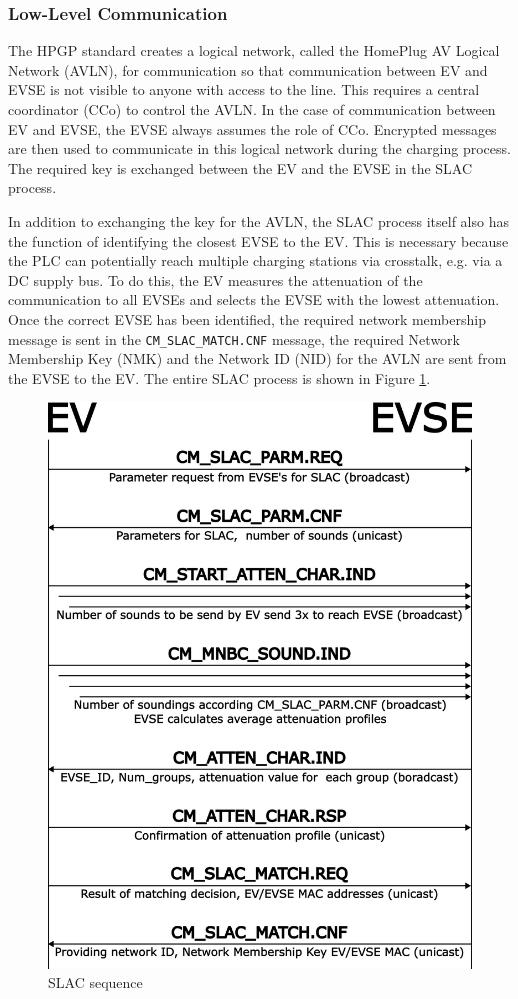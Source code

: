 \documentclass[sigconf]{acmart}
\begin{document}
\subsubsection{Low-Level Communication}
The HPGP standard creates a logical network, called the HomePlug AV Logical Network (AVLN), for communication so that communication between EV and EVSE is not visible to anyone with access to the line. This requires a central coordinator (CCo) to control the AVLN. In the case of communication between EV and EVSE, the EVSE always assumes the role of CCo. Encrypted messages are then used to communicate in this logical network during the charging process. The required key is exchanged between the EV and the EVSE in the SLAC process. \citep[pp.\,7--8]{homeplug-av-whitepaper}

In addition to exchanging the key for the AVLN, the SLAC process itself also has the function of identifying the closest EVSE to the EV. This is necessary because the PLC can potentially reach multiple charging stations via crosstalk, e.g. via a DC supply bus. To do this, the EV measures the attenuation of the communication to all EVSEs and selects the EVSE with the lowest attenuation. Once the correct EVSE has been identified, the required network membership message is sent in the \texttt{CM\_SLAC\_MATCH.CNF} message, the required Network Membership Key (NMK) and the Network ID (NID) for the AVLN are sent from the EVSE to the EV. The entire SLAC process is shown in Figure \ref{fig:slac-sequence}. \citep[pp.\,49--50]{bahrami-ev-2020} \citep[p.\,16]{homeplug-green-phy-whitepaper}

\begin{figure}[ht]
    \centering
    \includegraphics[width=0.7\linewidth]{graphics/SLAC_sequence_slim.png} %
    \caption{SLAC sequence \citep[p.\,50]{bahrami-ev-2020}}
    \label{fig:slac-sequence}
\end{figure}
\end{document}
